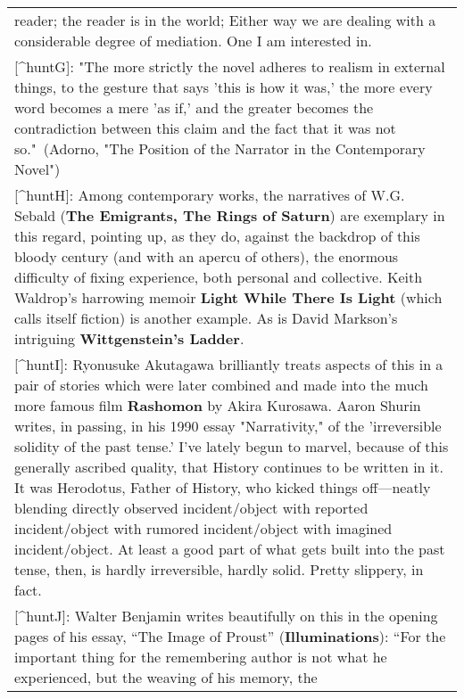 \begin{longtable}[]{@{}l@{}}
\begin{minipage}[t]{0.97\columnwidth}
reader; the reader is in the world; Either way we are dealing with a
considerable degree of mediation. One I am interested in.\strut
\end{minipage}\tabularnewline
\begin{minipage}[t]{0.97\columnwidth}\raggedright
{[}\^{}huntG{]}: "The more strictly the novel adheres to realism in
external things, to the gesture that says 'this is how it was,' the more
every word becomes a mere 'as if,' and the greater becomes the
contradiction between this claim and the fact that it was not
so."~(Adorno, "The Position of the Narrator in the Contemporary
Novel")\strut
\end{minipage}\tabularnewline
\begin{minipage}[t]{0.97\columnwidth}\raggedright
{[}\^{}huntH{]}: Among contemporary works, the narratives of W.G. Sebald
(\textbf{The Emigrants, The Rings of Saturn}) are exemplary in this
regard, pointing up, as they do, against the backdrop of this bloody
century (and with an apercu of others), the enormous difficulty of
fixing experience, both personal and collective. Keith Waldrop's
harrowing memoir \textbf{Light While There Is Light} (which calls itself
fiction) is another example. As is David Markson's intriguing
\textbf{Wittgenstein's Ladder}.\strut
\end{minipage}\tabularnewline
\begin{minipage}[t]{0.97\columnwidth}\raggedright
{[}\^{}huntI{]}: Ryonusuke Akutagawa brilliantly treats aspects of this
in a pair of stories which were later combined and made into the much
more famous film \textbf{Rashomon} by Akira Kurosawa. Aaron Shurin
writes, in passing, in his 1990 essay "Narrativity," of the
'irreversible solidity of the past tense.' I've lately begun to marvel,
because of this generally ascribed quality, that History continues to be
written in it. It was Herodotus, Father of History, who kicked things
off---neatly blending directly observed incident/object with reported
incident/object with rumored incident/object with imagined
incident/object. At least a good part of what gets built into the past
tense, then, is hardly irreversible, hardly solid. Pretty slippery, in
fact.\strut
\end{minipage}\tabularnewline
\begin{minipage}[t]{0.97\columnwidth}\raggedright
{[}\^{}huntJ{]}: Walter Benjamin writes beautifully on this in the
opening pages of his essay, ``The Image of Proust''
(\textbf{Illuminations}): ``For the important thing for the remembering
author is not what he experienced, but the weaving of his memory, the

\end{minipage}
\end{longtable}
